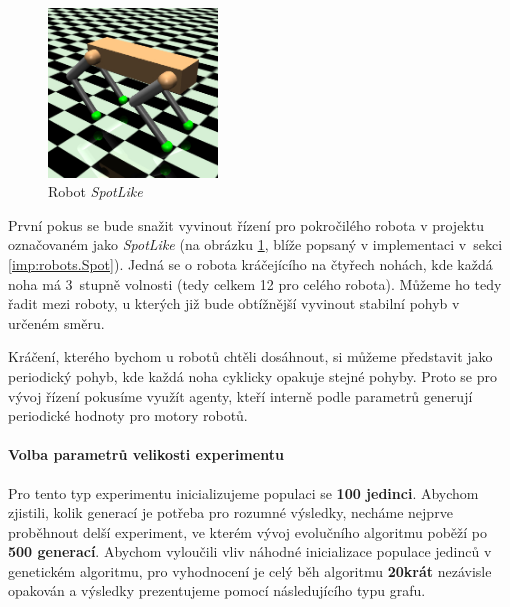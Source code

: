 \begin{figure}[!htb]
    \centering
    \includegraphics[width=0.4\textwidth]{../img/crop_SpotLike.jpg}
    \caption{Robot \emph{SpotLike}}
    \label{fig:robot:spotlike}
\end{figure}

První pokus se bude snažit vyvinout řízení pro pokročilého robota v projektu
označovaném jako \emph{SpotLike} (na obrázku \ref{fig:robot:spotlike}, blíže
popsaný v implementaci v~sekci \ref{imp:robots.Spot}). Jedná se o robota
kráčejícího na čtyřech nohách, kde každá noha má 3~stupně volnosti (tedy celkem
12 pro celého robota). Můžeme ho tedy řadit mezi roboty, u kterých již bude
obtížnější vyvinout stabilní pohyb v určeném směru.

Kráčení, kterého bychom u robotů chtěli dosáhnout, si můžeme představit jako
periodický pohyb, kde každá noha cyklicky opakuje stejné pohyby. Proto se pro
vývoj řízení pokusíme využít agenty, kteří interně podle parametrů generují
periodické hodnoty pro motory robotů. 

\paragraph{Volba parametrů velikosti experimentu}
Pro tento typ experimentu inicializujeme populaci se \textbf{100 jedinci}.
Abychom zjistili, kolik generací je potřeba pro rozumné výsledky, necháme
nejprve proběhnout delší experiment, ve kterém vývoj evolučního algoritmu
poběží po \textbf{500 generací}. Abychom vyloučili vliv náhodné inicializace
populace jedinců v genetickém algoritmu, pro vyhodnocení je celý
běh algoritmu \textbf{20krát} nezávisle opakován a výsledky prezentujeme
pomocí následujícího typu grafu.


